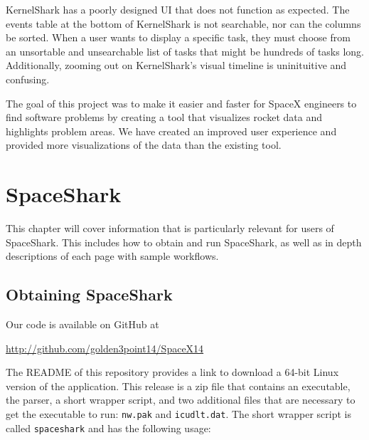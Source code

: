 \documentclass{hmcclinic}
\begin{document}
KernelShark has a poorly designed UI that does not function as expected. The
events table at the bottom of KernelShark is not searchable, nor can the columns
be sorted. When a user wants to display a specific task, they must choose from
an unsortable and unsearchable list of tasks that might be hundreds of tasks
long. Additionally, zooming out on KernelShark's visual timeline is
uninituitive and confusing.


The goal of this project was to make it easier and faster for SpaceX engineers
to find software problems by creating a tool that visualizes rocket data and
highlights problem areas. We have created an improved user experience and
provided more visualizations of the data than the existing tool. 
\chapter{SpaceShark}

This chapter will cover information that is particularly relevant for users of
SpaceShark. This includes how to obtain and run SpaceShark, as well as in depth
descriptions of each page with sample workflows.

\section{Obtaining SpaceShark}
  Our code is available on GitHub at
\begin{center}
  \url{http://github.com/golden3point14/SpaceX14}
\end{center}
The README of this repository provides a link to download a
  64-bit Linux version of the application. This release is a zip file that
  contains an executable, the parser, a short wrapper script, and two additional
  files that are necessary to get the executable to run: \texttt{nw.pak} and
  \texttt{icudlt.dat}.
  The short wrapper script is called \texttt{spaceshark} and has the following usage:
\end{document}
